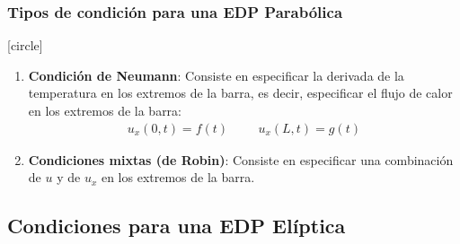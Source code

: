 \documentclass[12pt]{beamer}
\begin{document}
\begin{frame}
\frametitle{Tipos de condición para una EDP Parabólica}
[circle]
\begin{enumerate}[<+->]
\conti
\item \textbf{Condición de Neumann}: Consiste en especificar la derivada de la temperatura en los extremos de la barra, es decir, especificar el flujo de calor en los extremos de la barra:
\begin{align}
u_{x}(0,t) = f(t) \hspace{1cm} u_{x}(L,t) = g(t)
\label{eq:ecuacion_06_02_04}    
\end{align}
\item \textbf{Condiciones mixtas (de Robin)}: Consiste en especificar una combinación de $u$ y de $u_{x}$ en los extremos de la barra.
\end{enumerate}
\end{frame}

\subsection{Condiciones para una EDP Elíptica}
\end{document}
